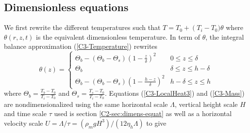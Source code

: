\subsection{Dimensionless equations}
\label{C3-sec:dimens-equat}

We   first    rewrite   the    different   temperatures    such   that
$T=T_0+\left(T_i-T_0)\theta$ where  $\theta(r,z,t)$ is  the equivalent
  dimensionless  temperature.   In  term  of  $\theta$,  the  integral
  balance approximation (\ref{C3-Temperature}) rewrites
  \begin{equation}
    \theta(z)=
    \begin{cases}
      \Theta_b -\left(\Theta_b-\Theta_s\right)(1-\frac{z}{\delta})^2& 0 \le z\le \delta \\
      \Theta_b & \delta \le z\le h-\delta \\
      \Theta_b -\left(\Theta_b-\Theta_s\right)(1-\frac{h-z}{\delta})^2
      & h-\delta \le z\le h
    \end{cases}
    \label{Temperature2}
  \end{equation}
  where            $\Theta_b=\frac{T_b-T_0}{T_{i}-T_0}$            and
  $\Theta_s        =       \frac{T_s-T_0}{T_i-T_0}$.         Equations
  (\ref{C3-LocalHeat3})  and  (\ref{C3-Mass})  are  nondimensionalized
  using the same horizontal scale $\Lambda$, vertical height scale $H$
  and time  scale $\tau$ used is  section \ref{C2-sec:dimens-equat} as
  well        as       a        horizontal       velocity        scale
  $U=\Lambda/\tau=\left(\rho_m          g          H^3\right)/\left(12
    \eta_h\Lambda\right)$ to give
